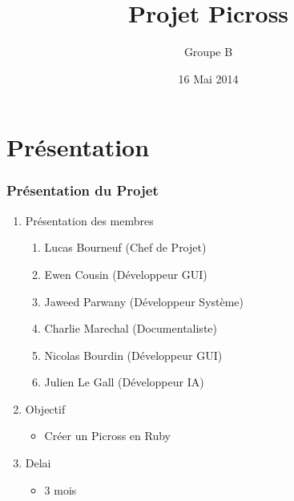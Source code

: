 \documentclass[12pt]{beamer}
\title {Projet Picross}
\author{Groupe B}
\date{16 Mai 2014}
\institute{Université du Maine}
\begin{document}
\maketitle
\begin{frame}{}
  \tableofcontents
\end{frame}
   
\section{Présentation}
\begin{frame}
\frametitle{Présentation du Projet}
    \begin{enumerate}
     
      \item Présentation des membres
        \begin{enumerate}
        \item Lucas Bourneuf   (Chef de Projet)
        \item Ewen Cousin      (Développeur GUI)
        \item Jaweed Parwany   (Développeur Système)
        \item Charlie Marechal (Documentaliste)
        \item Nicolas Bourdin  (Développeur GUI)
        \item Julien Le Gall    (Développeur IA)
        \end{enumerate}\pause
     
      \item Objectif
        \begin{itemize}
            \item Créer un Picross en Ruby
        \end{itemize}\pause
     
      \item Delai
        \begin{itemize}
            \item 3 mois
        \end{itemize}
 \end{enumerate}   
 \end{frame}
    
\end{document}
